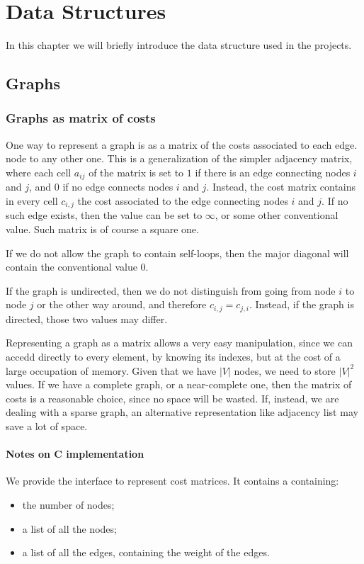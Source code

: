 \chapter{Data Structures}
In this chapter we will briefly introduce the data structure used in the projects.

\section{Graphs}
\subsection{Graphs as matrix of costs}
One way to represent a graph is as a matrix of the costs associated to each edge. node to any other one. This is a generalization of the simpler adjacency matrix, where each cell $a_{ij}$ of the matrix is set to $1$ if there is an edge connecting nodes $i$ and $j$, and $0$ if no edge connects nodes $i$ and $j$. Instead, the cost matrix contains in every cell $c_{i,j}$ the cost associated to the edge connecting nodes $i$ and $j$. If no such edge exists, then the value can be set to $\infty$, or some other conventional value. Such matrix is of course a square one.

If we do not allow the graph to contain self-loops, then the major diagonal will contain the conventional value $0$.

If the graph is undirected, then we do not distinguish from going from node $i$ to node $j$ or the other way around, and therefore $c_{i,j} = c_{j,i}$. Instead, if the graph is directed, those two values may differ.

Representing a graph as a matrix allows a very easy manipulation, since we can accedd directly to every element, by knowing its indexes, but at the cost of a large occupation of memory. Given that we have $|V|$ nodes, we need to store $|V|^2$ values. If we have a complete graph, or a near-complete one, then the matrix of costs is a reasonable choice, since no space will be wasted. If, instead, we are dealing with a sparse graph, an alternative representation like adjacency list may save a lot of space.

\subsubsection{Notes on C implementation}
We provide the  interface to represent cost matrices. It contains a  containing:
\begin{itemize}[noitemsep]
  \item the number of nodes;
  \item a list of all the nodes;
  \item a list of all the edges, containing the weight of the edges.
\end{itemize}

